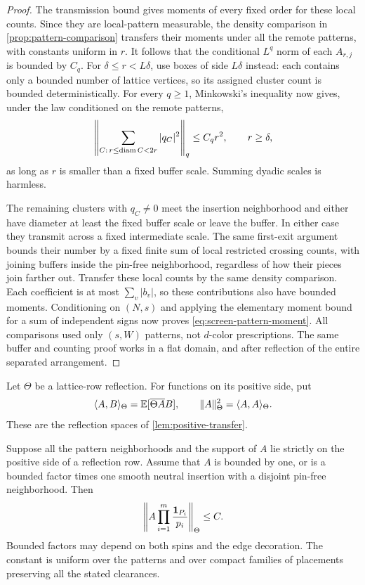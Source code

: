 \begin{proof}
The transmission bound gives moments of every fixed order for these local
counts. Since they are local-pattern measurable, the density comparison
in \cref{prop:pattern-comparison} transfers their moments under all the
remote patterns, with constants uniform in $r$. It follows that the
conditional $L^q$ norm of each $A_{r,j}$ is bounded by $C_q$. For
$\delta\le r<L\delta$, use boxes of side $L\delta$ instead: each contains
only a bounded number of lattice vertices, so its assigned cluster count
is bounded deterministically. For every $q\ge1$, Minkowski's inequality
now gives, under the law conditioned on the remote patterns,
\[
 \left\|\sum_{C:\,r\le\operatorname{diam} C<2r}|q_C|^2\right\|_q
       \le C_q r^2,\qquad r\ge\delta,
\]
as long as $r$ is smaller than a fixed buffer scale. Summing dyadic scales
is harmless.

The remaining clusters with $q_C\ne0$ meet the insertion neighborhood
and either have diameter at least the fixed buffer scale or leave the
buffer. In either case they transmit across a fixed intermediate scale.
The same first-exit argument bounds their number by a fixed finite sum of
local restricted crossing counts, with joining buffers inside the pin-free
neighborhood, regardless of how their pieces join farther out. Transfer
these local counts by the same density comparison. Each coefficient is at
most $\sum_v|b_v|$, so these contributions also have bounded moments.
Conditioning on $(N,s)$ and applying the elementary moment bound for a sum
of independent signs now proves
\eqref{eq:screen-pattern-moment}. All comparisons used only $(s,W)$
patterns, not $d$-color prescriptions. The same buffer and counting proof
works in a flat domain, and after reflection of the entire separated
arrangement.
\end{proof}

Let $\Theta$ be a lattice-row reflection. For functions on its positive
side, put
\[
 \langle A,B\rangle_\Theta=\mathbb E[\overline{\Theta A}B],
 \qquad \|A\|_\Theta^2=\langle A,A\rangle_\Theta.
\]
These are the reflection spaces of \cref{lem:positive-transfer}.

\begin{lemma}
\label{lem:screen-reflection-bound}
Suppose all the pattern neighborhoods and the support of $A$ lie
strictly on the positive side of a reflection row. Assume that $A$ is
bounded by one, or is a bounded factor times one smooth neutral insertion
with a disjoint pin-free neighborhood. Then
\begin{equation}
 \left\|A\prod_{i=1}^m\frac{\mathbf 1_{P_i}}{p_i}\right\|_\Theta
       \le C.
 \label{eq:screen-reflection-bound}
\end{equation}
Bounded factors may depend on both spins and the edge decoration. The
constant is uniform over the patterns and over compact families of
placements preserving all the stated clearances.
\end{lemma}

